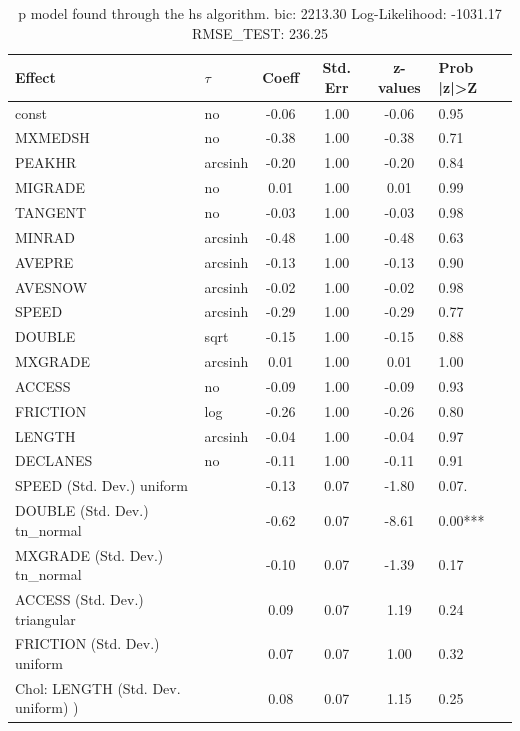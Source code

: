 \begin{table}
	\caption{p model found through the hs algorithm. bic: 2213.30 Log-Likelihood: -1031.17 RMSE_TEST: 236.25}
	\begin{center}
		\begin{tabular}{|l|l|c|c|c|l|}
			\hline
			Effect & $\tau$ & Coeff & Std. Err & z-values & Prob |z|>Z \\
			\hline
			const & no & -0.06 & 1.00 & -0.06 & 0.95 \\
			\hline
			MXMEDSH & no & -0.38 & 1.00 & -0.38 & 0.71 \\
			\hline
			PEAKHR & arcsinh & -0.20 & 1.00 & -0.20 & 0.84 \\
			\hline
			MIGRADE & no & 0.01 & 1.00 & 0.01 & 0.99 \\
			\hline
			TANGENT & no & -0.03 & 1.00 & -0.03 & 0.98 \\
			\hline
			MINRAD & arcsinh & -0.48 & 1.00 & -0.48 & 0.63 \\
			\hline
			AVEPRE & arcsinh & -0.13 & 1.00 & -0.13 & 0.90 \\
			\hline
			AVESNOW & arcsinh & -0.02 & 1.00 & -0.02 & 0.98 \\
			\hline
			SPEED & arcsinh & -0.29 & 1.00 & -0.29 & 0.77 \\
			\hline
			DOUBLE & sqrt & -0.15 & 1.00 & -0.15 & 0.88 \\
			\hline
			MXGRADE & arcsinh & 0.01 & 1.00 & 0.01 & 1.00 \\
			\hline
			ACCESS & no & -0.09 & 1.00 & -0.09 & 0.93 \\
			\hline
			FRICTION & log & -0.26 & 1.00 & -0.26 & 0.80 \\
			\hline
			LENGTH & arcsinh & -0.04 & 1.00 & -0.04 & 0.97 \\
			\hline
			DECLANES & no & -0.11 & 1.00 & -0.11 & 0.91 \\
			\hline
			SPEED (Std. Dev.) uniform &  & -0.13 & 0.07 & -1.80 & 0.07. \\
			\hline
			DOUBLE (Std. Dev.) tn_normal &  & -0.62 & 0.07 & -8.61 & 0.00*** \\
			\hline
			MXGRADE (Std. Dev.) tn_normal &  & -0.10 & 0.07 & -1.39 & 0.17 \\
			\hline
			ACCESS (Std. Dev.) triangular &  & 0.09 & 0.07 & 1.19 & 0.24 \\
			\hline
			FRICTION (Std. Dev.) uniform &  & 0.07 & 0.07 & 1.00 & 0.32 \\
			\hline
			 Chol: LENGTH (Std. Dev. uniform) ) &  & 0.08 & 0.07 & 1.15 & 0.25 \\

\end{tabular}
\end{center}
\end{table}
